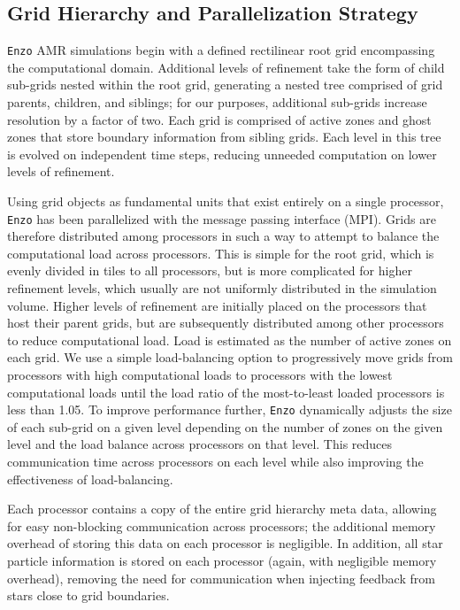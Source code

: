 \documentclass[11pt]{article}
\begin{document}
\subsection{Grid Hierarchy and Parallelization Strategy}

\texttt{Enzo} AMR simulations begin with a defined rectilinear root grid encompassing the computational domain. Additional levels of refinement take the form of child sub-grids nested within the root grid, generating a nested tree comprised of grid parents, children, and siblings; for our purposes, additional sub-grids increase resolution by a factor of two. Each grid is comprised of active zones and ghost zones that store boundary information from sibling grids. Each level in this tree is evolved on independent time steps, reducing unneeded computation on lower levels of refinement.

Using grid objects as fundamental units that exist entirely on a single processor, \texttt{Enzo} has been parallelized with the message passing interface (MPI). Grids are therefore distributed among processors in such a way to attempt to balance the computational load across processors. This is simple for the root grid, which is evenly divided in tiles to all processors, but is more complicated for higher refinement levels, which usually are not uniformly distributed in the simulation volume. Higher levels of refinement are initially placed on the processors that host their parent grids, but are subsequently distributed among other processors to reduce computational load. Load is estimated as the number of active zones on each grid. We use a simple load-balancing option to progressively move grids from processors with high computational loads to processors with the lowest computational loads until the load ratio of the most-to-least loaded processors is less than 1.05. To improve performance further, \texttt{Enzo} dynamically adjusts the size of each sub-grid on a given level depending on the number of zones on the given level and the load balance across processors on that level. This reduces communication time across processors on each level while also improving the effectiveness of load-balancing. 

Each processor contains a copy of the entire grid hierarchy meta data, allowing for easy non-blocking communication across processors; the additional memory overhead of storing this data on each processor is negligible. In addition, all star particle information is stored on each processor (again, with negligible memory overhead), removing the need for communication when injecting feedback from stars close to grid boundaries.
\end{document}
